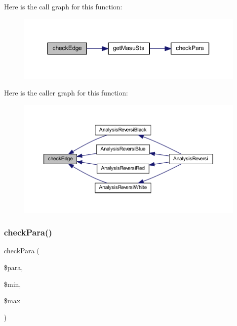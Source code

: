 Here is the call graph for this function\+:\nopagebreak
\begin{figure}[H]
\begin{center}
\leavevmode
\includegraphics[width=349pt]{class_reversi_acd2c64ea43cc26407ad64920a183446b_cgraph}
\end{center}
\end{figure}
Here is the caller graph for this function\+:\nopagebreak
\begin{figure}[H]
\begin{center}
\leavevmode
\includegraphics[width=350pt]{class_reversi_acd2c64ea43cc26407ad64920a183446b_icgraph}
\end{center}
\end{figure}
\mbox{\label{class_reversi_ac8d57b64bc839c8bb1f53a2a5db11228}} 
\subsubsection{\texorpdfstring{check\+Para()}{checkPara()}}
{\footnotesize\ttfamily check\+Para (\begin{DoxyParamCaption}\item[{}]{\$para,  }\item[{}]{\$min,  }\item[{}]{\$max }\end{DoxyParamCaption})\hspace{0.3cm}{\ttfamily [private]}}



